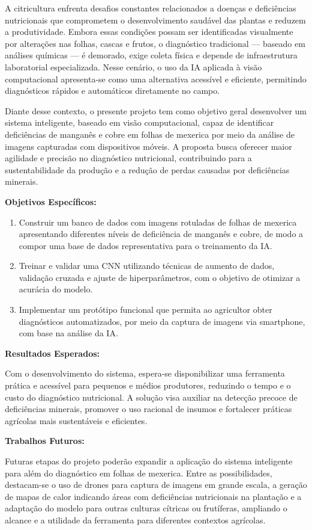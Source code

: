 A citricultura enfrenta desafios constantes relacionados a doenças e deficiências nutricionais que comprometem o desenvolvimento saudável das plantas e reduzem a produtividade. Embora essas condições possam ser identificadas visualmente por alterações nas folhas, cascas e frutos, o diagnóstico tradicional — baseado em análises químicas — é demorado, exige coleta física e depende de infraestrutura laboratorial especializada. Nesse cenário, o uso da IA aplicada à visão computacional apresenta-se como uma alternativa acessível e eficiente, permitindo diagnósticos rápidos e automáticos diretamente no campo.

Diante desse contexto, o presente projeto tem como objetivo geral desenvolver um sistema inteligente, baseado em visão computacional, capaz de identificar deficiências de manganês e cobre em folhas de mexerica por meio da análise de imagens capturadas com dispositivos móveis. A proposta busca oferecer maior agilidade e precisão no diagnóstico nutricional, contribuindo para a sustentabilidade da produção e a redução de perdas causadas por deficiências minerais.

\textbf{Objetivos Específicos:}
\begin{enumerate}
\item Construir um banco de dados com imagens rotuladas de folhas de mexerica apresentando diferentes níveis de deficiência de manganês e cobre, de modo a compor uma base de dados representativa para o treinamento da IA.
\item Treinar e validar uma CNN utilizando técnicas de aumento de dados, validação cruzada e ajuste de hiperparâmetros, com o objetivo de otimizar a acurácia do modelo.
\item Implementar um protótipo funcional que permita ao agricultor obter diagnósticos automatizados, por meio da captura de imagens via smartphone, com base na análise da IA.
\end{enumerate}

\textbf{Resultados Esperados:}

Com o desenvolvimento do sistema, espera-se disponibilizar uma ferramenta prática e acessível para pequenos e médios produtores, reduzindo o tempo e o custo do diagnóstico nutricional. A solução visa auxiliar na detecção precoce de deficiências minerais, promover o uso racional de insumos e fortalecer práticas agrícolas mais sustentáveis e eficientes.

\textbf{Trabalhos Futuros:}

Futuras etapas do projeto poderão expandir a aplicação do sistema inteligente para além do diagnóstico em folhas de mexerica. Entre as possibilidades, destacam-se o uso de drones para captura de imagens em grande escala, a geração de mapas de calor indicando áreas com deficiências nutricionais na plantação e a adaptação do modelo para outras culturas cítricas ou frutíferas, ampliando o alcance e a utilidade da ferramenta para diferentes contextos agrícolas.
